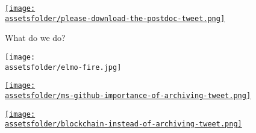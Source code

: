 \documentclass{beamer}
\newcommand{\assetsfolder}{./assets}
\begin{document}
    \begin{frame}
        \begin{center}
            \href{}{\texttt{[image: \\assetsfolder/please-download-the-postdoc-tweet.png]}}
        \end{center}

    \end{frame}

    \begin{frame}
        \begin{center}
            \Huge What do we do?
        \end{center}
        \pause
        \begin{center}
            \texttt{[image: \\assetsfolder/elmo-fire.jpg]}
        \end{center}

    \end{frame}

    \begin{frame}
        \begin{center}
            \href{https://twitter.com/betatim/status/1004077975233552385}{\texttt{[image: \\assetsfolder/ms-github-importance-of-archiving-tweet.png]}}
        \end{center}
    \end{frame}

    \begin{frame}
        \begin{center}
            \href{https://twitter.com/JamesCampbell95/status/996419422951825410}{\texttt{[image: \\assetsfolder/blockchain-instead-of-archiving-tweet.png]}}
        \end{center}

    \end{frame}
\end{document}
